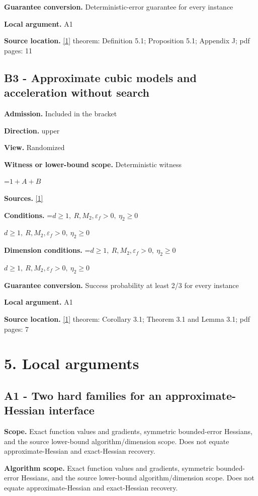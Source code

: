 \documentclass[10pt,a4paper]{article}
\newcommand{\AtlasMath}[1]{\par\begingroup\centering\setbox0=\hbox{$\displaystyle #1$}\ifdim\wd0>1.4\linewidth\typeout{ATLAS WIDE FORMULA: \the\wd0}\fi\ifdim\wd0>\linewidth\resizebox{\linewidth}{!}{\box0}\else\box0\fi\par\endgroup}
\newcommand{\AtlasInlineMath}[1]{\begingroup\setbox0=\hbox{$#1$}\ifdim\wd0>.4\linewidth\endgroup\AtlasMath{#1}\else\endgroup$#1$\fi}
\begin{document}
\textbf{Guarantee conversion.} Deterministic-error guarantee for every instance

\textbf{Local argument.} A1

\textbf{Source location.} \href{https://arxiv.org/abs/2607.24520v3}{[1]} theorem: Definition 5.1; Proposition 5.1; Appendix J; pdf pages: 11

\subsection{B3 - Approximate cubic models and acceleration without search}
\textbf{Admission.} Included in the bracket

\textbf{Direction.} upper

\textbf{View.} Randomized

\textbf{Witness or lower-bound scope.} Deterministic witness

\AtlasMath{1+A+B}
\textbf{Sources.} \href{https://arxiv.org/abs/2607.24520v3}{[1]}

\textbf{Conditions.} \AtlasInlineMath{d\ge1,\ R,M_2,\varepsilon_f>0,\ \eta_2\ge0}

\textbf{Dimension conditions.} \AtlasInlineMath{d\ge1,\ R,M_2,\varepsilon_f>0,\ \eta_2\ge0}

\textbf{Guarantee conversion.} Success probability at least 2/3 for every instance

\textbf{Local argument.} A1

\textbf{Source location.} \href{https://arxiv.org/abs/2607.24520v3}{[1]} theorem: Corollary 3.1; Theorem 3.1 and Lemma 3.1; pdf pages: 7

\section{5. Local arguments}
\subsection{A1 - Two hard families for an approximate-Hessian interface}
\textbf{Scope.} Exact function values and gradients, symmetric bounded-error Hessians, and the source lower-bound algorithm/dimension scope. Does not equate approximate-Hessian and exact-Hessian recovery.

\textbf{Algorithm scope.} Exact function values and gradients, symmetric bounded-error Hessians, and the source lower-bound algorithm/dimension scope. Does not equate approximate-Hessian and exact-Hessian recovery.
\end{document}
